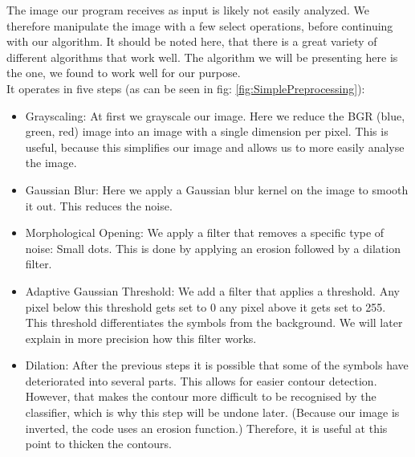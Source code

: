 \documentclass[12pt]{article}
\begin{document}
		The image our program receives as input is likely not easily analyzed.
		We therefore manipulate the image with a few select operations, before continuing with our algorithm.
		It should be noted here, that there is a great variety of different algorithms that work well.
		The algorithm we will be presenting here is the one, we found to work well for our purpose.\\
		It operates in five steps (as can be seen in fig: \ref{fig:SimplePreprocessing}):
		\begin{itemize}
			\item Grayscaling: At first we grayscale our image. Here we reduce the BGR (blue, green, red) image into an image with a single dimension per pixel. This is useful, because this simplifies our image and allows us to more easily analyse the image.
			\item Gaussian Blur: Here we apply a Gaussian blur kernel on the image to smooth it out. This reduces the noise.
			\item Morphological Opening: We apply a filter that removes a specific type of noise: Small dots. This is done by applying an erosion followed by a dilation filter. %
			\item Adaptive Gaussian Threshold: We add a filter that applies a threshold. Any pixel below this threshold gets set to 0 any pixel above it gets set to 255. %
			This threshold differentiates the symbols from the background.
			We will later explain in more precision how this filter works. %
			\item Dilation: After the previous steps it is possible that some of the symbols have deteriorated into several parts.
			This allows for easier contour detection.
			However, that makes the contour more difficult to be recognised by the classifier, which is why this step will be undone later. %
			(Because our image is inverted, the code uses an erosion function.) %
			Therefore, it is useful at this point to thicken the contours.
		\end{itemize}
			
\end{document}
